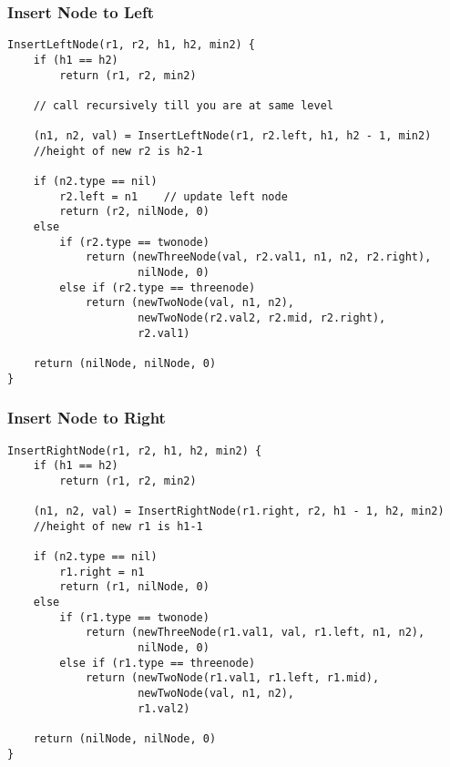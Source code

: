 \subsubsection{Insert Node to Left}
\begin{lstlisting}
InsertLeftNode(r1, r2, h1, h2, min2) {
    if (h1 == h2)
        return (r1, r2, min2)
    
    // call recursively till you are at same level 
    
    (n1, n2, val) = InsertLeftNode(r1, r2.left, h1, h2 - 1, min2) 
    //height of new r2 is h2-1
    
    if (n2.type == nil)
        r2.left = n1    // update left node
        return (r2, nilNode, 0)
    else
        if (r2.type == twonode)
            return (newThreeNode(val, r2.val1, n1, n2, r2.right), 
                    nilNode, 0)
    	else if (r2.type == threenode) 
            return (newTwoNode(val, n1, n2), 
                    newTwoNode(r2.val2, r2.mid, r2.right), 
                    r2.val1)

    return (nilNode, nilNode, 0)
}
\end{lstlisting}

\subsubsection{Insert Node to Right}
\begin{lstlisting}
InsertRightNode(r1, r2, h1, h2, min2) {
    if (h1 == h2)
        return (r1, r2, min2)

    (n1, n2, val) = InsertRightNode(r1.right, r2, h1 - 1, h2, min2) 
    //height of new r1 is h1-1

    if (n2.type == nil)
        r1.right = n1
        return (r1, nilNode, 0)
    else
        if (r1.type == twonode)
            return (newThreeNode(r1.val1, val, r1.left, n1, n2), 
                    nilNode, 0)
        else if (r1.type == threenode) 
            return (newTwoNode(r1.val1, r1.left, r1.mid), 
                    newTwoNode(val, n1, n2), 
                    r1.val2)
            
    return (nilNode, nilNode, 0)
}

\end{lstlisting}

